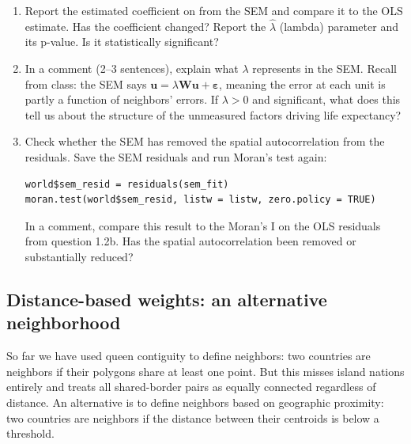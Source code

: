 \begin{enumerate}[label=\alph*)]

  \item Report the estimated coefficient on  from the SEM and compare it to the OLS estimate. Has the coefficient changed? Report the $\hat{\lambda}$ (lambda) parameter and its p-value. Is it statistically significant?

  \item In a comment (2--3 sentences), explain what $\lambda$ represents in the SEM. Recall from class: the SEM says $\mathbf{u} = \lambda \mathbf{W}\mathbf{u} + \boldsymbol{\varepsilon}$, meaning the error at each unit is partly a function of neighbors' errors. If $\lambda > 0$ and significant, what does this tell us about the structure of the unmeasured factors driving life expectancy?

  \item Check whether the SEM has removed the spatial autocorrelation from the residuals. Save the SEM residuals and run Moran's test again:
  \begin{lstlisting}
world$sem_resid = residuals(sem_fit)
moran.test(world$sem_resid, listw = listw, zero.policy = TRUE)
  \end{lstlisting}
  In a comment, compare this result to the Moran's I on the OLS residuals from question 1.2b. Has the spatial autocorrelation been removed or substantially reduced?

\end{enumerate}

\subsection{Distance-based weights: an alternative neighborhood}

So far we have used queen contiguity to define neighbors: two countries are neighbors if their polygons share at least one point. But this misses island nations entirely and treats all shared-border pairs as equally connected regardless of distance. An alternative is to define neighbors based on geographic proximity: two countries are neighbors if the distance between their centroids is below a threshold.

